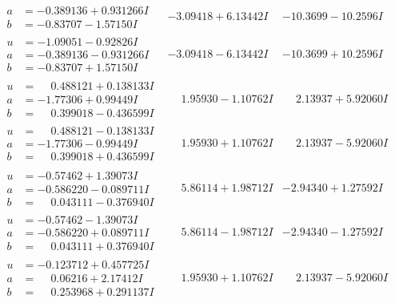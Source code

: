 \documentclass[1p]{elsarticle_modified}
\theoremstyle{definition}
\begin{document}
$$\begin{array}{c|c|c}
\begin{aligned}
a &= -0.389136 + 0.931266 I \\
b &= -0.83707 - 1.57150 I\end{aligned}
 & -3.09418 + 6.13442 I & -10.3699 - 10.2596 I \\ \hline\begin{aligned}
u &= -1.09051 - 0.92826 I \\
a &= -0.389136 - 0.931266 I \\
b &= -0.83707 + 1.57150 I\end{aligned}
 & -3.09418 - 6.13442 I & -10.3699 + 10.2596 I \\ \hline\begin{aligned}
u &= \phantom{-}0.488121 + 0.138133 I \\
a &= -1.77306 + 0.99449 I \\
b &= \phantom{-}0.399018 - 0.436599 I\end{aligned}
 & \phantom{-}1.95930 - 1.10762 I & \phantom{-}2.13937 + 5.92060 I \\ \hline\begin{aligned}
u &= \phantom{-}0.488121 - 0.138133 I \\
a &= -1.77306 - 0.99449 I \\
b &= \phantom{-}0.399018 + 0.436599 I\end{aligned}
 & \phantom{-}1.95930 + 1.10762 I & \phantom{-}2.13937 - 5.92060 I \\ \hline\begin{aligned}
u &= -0.57462 + 1.39073 I \\
a &= -0.586220 - 0.089711 I \\
b &= \phantom{-}0.043111 - 0.376940 I\end{aligned}
 & \phantom{-}5.86114 + 1.98712 I & -2.94340 + 1.27592 I \\ \hline\begin{aligned}
u &= -0.57462 - 1.39073 I \\
a &= -0.586220 + 0.089711 I \\
b &= \phantom{-}0.043111 + 0.376940 I\end{aligned}
 & \phantom{-}5.86114 - 1.98712 I & -2.94340 - 1.27592 I \\ \hline\begin{aligned}
u &= -0.123712 + 0.457725 I \\
a &= \phantom{-}0.06216 + 2.17412 I \\
b &= \phantom{-}0.253968 + 0.291137 I\end{aligned}
 & \phantom{-}1.95930 + 1.10762 I & \phantom{-}2.13937 - 5.92060 I \\ \hline\begin{aligned}

\end{aligned}
\end{array}$$
\end{document}
